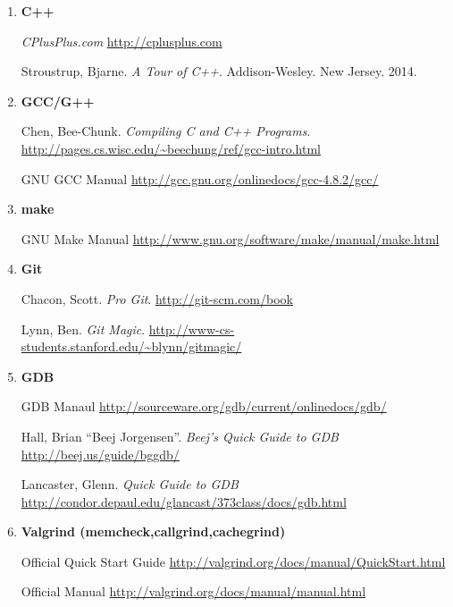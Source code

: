 \documentclass[10pt]{article}
\begin{document}
\begin{enumerate}
\begin{itemize}
\end{itemize}

\item \textbf{C++}

\textit{CPlusPlus.com}
\newline \url{http://cplusplus.com}
\vspace{.25in}

Stroustrup, Bjarne. \textit{A Tour of C++}. Addison-Wesley. New Jersey. 2014.
\vspace{.25in}

\item \textbf{GCC/G++}

Chen, Bee-Chunk. \textit{Compiling C and C++ Programs}.
\newline \url{http://pages.cs.wisc.edu/~beechung/ref/gcc-intro.html}
\vspace{.25in}

GNU GCC Manual \newline
\url{http://gcc.gnu.org/onlinedocs/gcc-4.8.2/gcc/}
\vspace{.25in}

\item \textbf{make}

GNU Make Manual \newline
\url{http://www.gnu.org/software/make/manual/make.html}
\vspace{.25in}

\item \textbf{Git}

Chacon, Scott. \textit{Pro Git}. \url{http://git-scm.com/book}
\vspace{.25in}

Lynn, Ben. \textit{Git Magic}. \url{http://www-cs-students.stanford.edu/~blynn/gitmagic/}
\vspace{.25in}

\item \textbf{GDB}

GDB Manaul \newline
\url{http://sourceware.org/gdb/current/onlinedocs/gdb/}
\vspace{.25in}

Hall, Brian ``Beej Jorgensen''. \textit{Beej's Quick Guide to GDB} \newline
\url{http://beej.us/guide/bggdb/}
\vspace{.25in}

Lancaster, Glenn. \textit{Quick Guide to GDB} \newline
\url{http://condor.depaul.edu/glancast/373class/docs/gdb.html}
\vspace{.25in}

\item \textbf{Valgrind (memcheck,callgrind,cachegrind)}

Official Quick Start Guide \newline
\url{http://valgrind.org/docs/manual/QuickStart.html}
\vspace{.25in}

Official Manual \newline
\url{http://valgrind.org/docs/manual/manual.html}

\end{enumerate}
\end{document}
